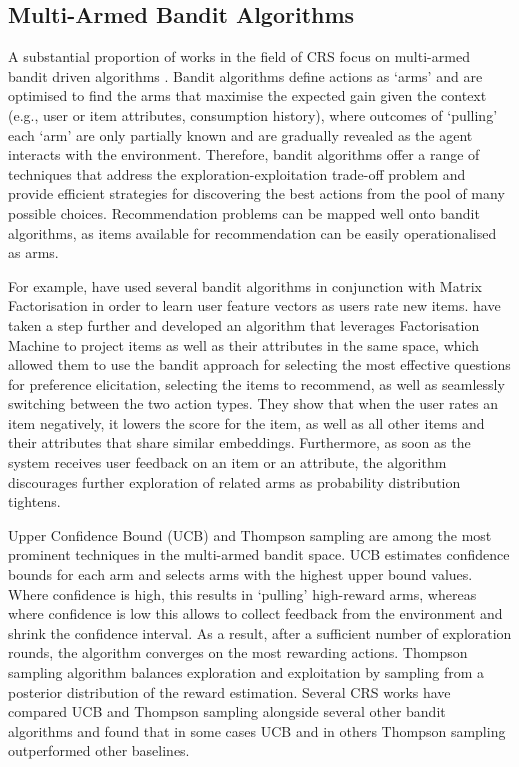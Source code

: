\subsection{Multi-Armed Bandit Algorithms}
A substantial proportion of works in the field of CRS focus on multi-armed bandit driven algorithms \citep{zhao2013interactive, christakopoulou2016towards,  li2021seamlessly}. Bandit algorithms define actions as ‘arms’ and are optimised to find the arms that maximise the expected gain given the context (e.g., user or item attributes, consumption history), where outcomes of ‘pulling’ each ‘arm’ are only partially known and are gradually revealed as the agent interacts with the environment. Therefore, bandit algorithms offer a range of techniques that address the exploration-exploitation trade-off problem and provide efficient strategies for discovering the best actions from the pool of many possible choices. Recommendation problems can be mapped well onto bandit algorithms, as items available for recommendation can be easily operationalised as arms. 

For example, \cite{zhao2013interactive} have used several bandit algorithms in conjunction with Matrix Factorisation in order to learn user feature vectors as users rate new items. \cite{li2021seamlessly} have taken a step further and developed an algorithm that leverages Factorisation Machine to project items as well as their attributes in the same space, which allowed them to use the bandit approach for selecting the most effective questions for preference elicitation, selecting the items to recommend, as well as seamlessly switching between the two action types. They show that when the user rates an item negatively, it lowers the score for the item, as well as all other items and their attributes that share similar embeddings. Furthermore, as soon as the system receives user feedback on an item or an attribute, the algorithm discourages further exploration of related arms as probability distribution tightens.

Upper Confidence Bound (UCB) and Thompson sampling are among the most prominent techniques in the multi-armed bandit space. UCB estimates confidence bounds for each arm and selects arms with the highest upper bound values. Where confidence is high, this results in ‘pulling’ high-reward arms, whereas where confidence is low this allows to collect feedback from the environment and shrink the confidence interval. As a result, after a sufficient number of exploration rounds, the algorithm converges on the most rewarding actions. Thompson sampling algorithm balances exploration and exploitation by sampling from a posterior distribution of the reward estimation. Several CRS works have compared UCB and Thompson sampling alongside several other bandit algorithms and found that in some cases UCB \citep{zhao2013interactive} and in others Thompson sampling \citep{li2021seamlessly} outperformed other baselines.


